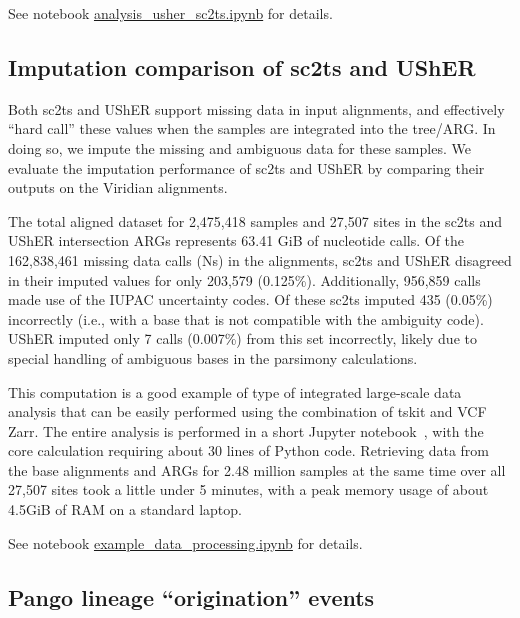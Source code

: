 \documentclass[12pt]{article}
\begin{document}
See notebook
\href{https://github.com/jeromekelleher/sc2ts-paper/blob/main/notebooks/analysis\_usher\_sc2ts.ipynb}{analysis\_usher\_sc2ts.ipynb}
for details.


\subsection{Imputation comparison of sc2ts and UShER}
\label{sec:supplement_sc2ts_usher_imputation}

Both sc2ts and UShER support missing data in input alignments, and effectively
``hard call'' these values when the samples are integrated into the tree/ARG.
In doing so, we impute the missing and ambiguous data for these samples.
We evaluate the imputation performance of sc2ts and UShER by comparing their
outputs on the Viridian alignments.

The total aligned dataset for 2,475,418 samples and 27,507 sites
in the sc2ts and UShER intersection ARGs represents
63.41 GiB of nucleotide calls.
Of the 162,838,461 missing data calls (Ns) in the alignments,
sc2ts and UShER disagreed in their imputed values for only 203,579 (0.125\%).
Additionally, 956,859 calls made use of the IUPAC uncertainty codes.
Of these sc2ts imputed 435 (0.05\%) incorrectly
(i.e., with a base that is not compatible with the ambiguity code).
UShER imputed only 7 calls (0.007\%) from this set incorrectly,
likely due to special handling of
ambiguous bases in the parsimony calculations.

This computation is a good example of
type of integrated large-scale data analysis
that can be easily performed using the combination of tskit and VCF Zarr.
The entire analysis is performed in a short Jupyter
notebook~\cite{kluyver2016jupyter},
with the core calculation requiring about 30 lines of Python code.
Retrieving data from the base alignments and ARGs for 2.48 million samples
at the same time over all 27,507 sites took a little under 5 minutes,
with a peak memory usage of about 4.5GiB of RAM
on a standard laptop.

See notebook
\href{https://github.com/jeromekelleher/sc2ts-paper/blob/main/notebooks/example\_data\_processing.ipynb}{example\_data\_processing.ipynb}
for details.

\subsection{Pango lineage ``origination'' events}
\label{sec:supplement_pango_lineages}
\end{document}
